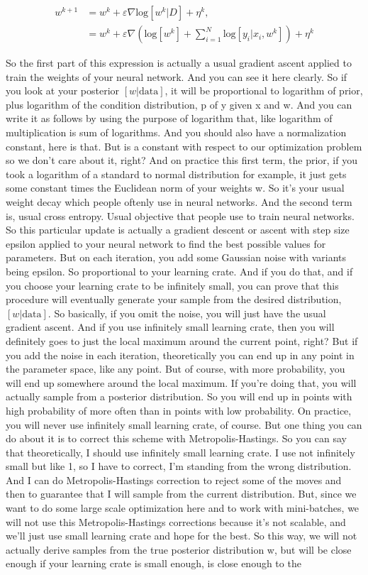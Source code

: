 \documentclass[11pt, oneside, reqno]{amsart}
\numberwithin{equation}{section}
\theoremstyle{plain}%
\theoremstyle{definition}
\theoremstyle{remark}
\begin{document}
\begin{align*}
	w^{k+1}&=w^k+\varepsilon\nabla \text{log}[w^k|D]+\eta^k,\\
	&=w^k+\varepsilon\nabla\left(\text{log}[w^k]+\sum^N_{i=1}\text{log}[y_i|x_i,w^k]\right)+\eta^k
\end{align*}

So the first part of this expression is actually a usual gradient ascent applied to train the weights of your neural network. And you can see it here clearly. So if you look at your posterior $[w|\text{data}]$, it will be proportional to logarithm of prior, plus logarithm of the condition distribution, p of y given x and w. And you can write it as follows by using the purpose of logarithm that, like logarithm of multiplication is sum of logarithms. And you should also have a normalization constant, here is that. But is a constant with respect to our optimization problem so we don't care about it, right? And on practice this first term, the prior, if you took a logarithm of a standard to normal distribution for example, it just gets some constant times the Euclidean norm of your weights w. So it's your usual weight decay which people oftenly use in neural networks. And the second term is, usual cross entropy. Usual objective that people use to train neural networks. So this particular update is actually a gradient descent or ascent with step size epsilon applied to your neural network to find the best possible values for parameters. But on each iteration, you add some Gaussian noise with variants being epsilon. So proportional to your learning crate. And if you do that, and if you choose your learning crate to be infinitely small, you can prove that this procedure will eventually generate your sample from the desired distribution, $[w|\text{data}]$. So basically, if you omit the noise, you will just have the usual gradient ascent. And if you use infinitely small learning crate, then you will definitely goes to just the local maximum around the current point, right? But if you add the noise in each iteration, theoretically you can end up in any point in the parameter space, like any point. But of course, with more probability, you will end up somewhere around the local maximum. If you're doing that, you will actually sample from a posterior distribution. So you will end up in points with high probability of more often than in points with low probability. On practice, you will never use infinitely small learning crate, of course. But one thing you can do about it is to correct this scheme with Metropolis-Hastings. So you can say that theoretically, I should use infinitely small learning crate. I use not infinitely small but like 1, so I have to correct, I'm standing from the wrong distribution. And I can do Metropolis-Hastings correction to reject some of the moves and then to guarantee that I will sample from the current distribution. But, since we want to do some large scale optimization here and to work with mini-batches, we will not use this Metropolis-Hastings corrections because it's not scalable, and we'll just use small learning crate and hope for the best. So this way, we will not actually derive samples from the true posterior distribution w, but will be close enough if your learning crate is small enough, is close enough to the 
\end{document}
